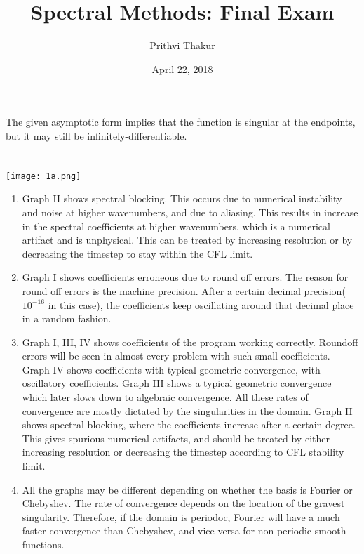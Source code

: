 \documentclass{article}
\title{Spectral Methods: Final Exam}
\author{Prithvi Thakur}
\date{April 22, 2018}
\begin{document}
\maketitle

\section{}
The given asymptotic form implies that the function is singular at the endpoints, but it may still be infinitely-differentiable.

\section{}
\texttt{[image: 1a.png]}
\renewcommand{\theenumi}{\roman{enumi}}
\begin{enumerate}
\item Graph II shows spectral blocking. This occurs due to numerical instability and noise at higher wavenumbers, and due to aliasing. This results in increase in the spectral coefficients at higher wavenumbers, which is a numerical artifact and is unphysical. This can be treated by increasing resolution or by decreasing the timestep to stay within the CFL limit.
    
\item Graph I shows coefficients erroneous due to round off errors. The reason for round off errors is the machine precision. After a certain decimal precision($10^{-16}$ in this case), the coefficients keep oscillating around that decimal place in a random fashion.

\item Graph I, III, IV shows coefficients of the program working correctly. Roundoff errors will be seen in almost every problem with such small coefficients. Graph IV shows coefficients with typical geometric convergence, with oscillatory coefficients. Graph III shows a typical geometric convergence which later slows down to algebraic convergence. All these rates of convergence are mostly dictated by the singularities in the domain. Graph II shows spectral blocking, where the coefficients increase after a certain degree. This gives spurious numerical artifacts, and should be treated by either increasing resolution or decreasing the timestep according to CFL stability limit.

\item  All the graphs may be different depending on whether the basis is Fourier or Chebyshev. The rate of convergence depends on the location of the gravest singularity. Therefore, if the domain is periodoc, Fourier will have a much faster convergence than Chebyshev, and vice versa for non-periodic smooth functions.
\end{enumerate}
\end{document}
